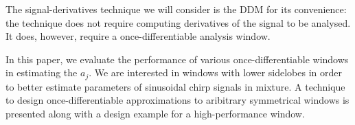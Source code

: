 \documentclass[twoside,a4paper]{article}
\begin{document}
The signal-derivatives technique we will consider is the
DDM for its convenience: the technique does not
require computing derivatives of the signal to be analysed. It does, however, require a
once-differentiable analysis window.

In this paper, we evaluate the performance of various once-differentiable
windows in estimating the $a_{j}$. We are interested in windows with lower
sidelobes in order to better estimate parameters of sinusoidal chirp signals in
mixture. A technique to design once-differentiable approximations to aribitrary
symmetrical windows is presented along with a design example for a
high-performance window.

%
%
\end{document}
